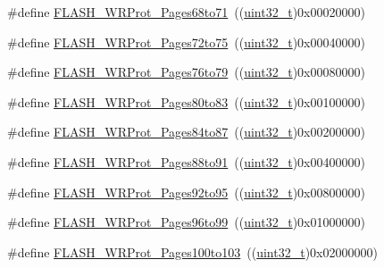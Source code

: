 \begin{DoxyCompactItemize}
\#define \hyperlink{group___option___bytes___write___protection_gafbb813885c6cd505c64083f2f88532fb}{F\+L\+A\+S\+H\+\_\+\+W\+R\+Prot\+\_\+\+Pages68to71}~((\hyperlink{_p_e___types_8h_a33594304e786b158f3fb30289278f5af}{uint32\+\_\+t})0x00020000)
\item 
\#define \hyperlink{group___option___bytes___write___protection_ga1a19c52012bbb30f3ae1599fa5a200cc}{F\+L\+A\+S\+H\+\_\+\+W\+R\+Prot\+\_\+\+Pages72to75}~((\hyperlink{_p_e___types_8h_a33594304e786b158f3fb30289278f5af}{uint32\+\_\+t})0x00040000)
\item 
\#define \hyperlink{group___option___bytes___write___protection_ga9e1f9abfa57766312c6cbae9b42f3ab6}{F\+L\+A\+S\+H\+\_\+\+W\+R\+Prot\+\_\+\+Pages76to79}~((\hyperlink{_p_e___types_8h_a33594304e786b158f3fb30289278f5af}{uint32\+\_\+t})0x00080000)
\item 
\#define \hyperlink{group___option___bytes___write___protection_ga5749428874f99f77a5c5fc48a88816d9}{F\+L\+A\+S\+H\+\_\+\+W\+R\+Prot\+\_\+\+Pages80to83}~((\hyperlink{_p_e___types_8h_a33594304e786b158f3fb30289278f5af}{uint32\+\_\+t})0x00100000)
\item 
\#define \hyperlink{group___option___bytes___write___protection_ga9dbf7aeb5b54b42f9b345c95d00eaf32}{F\+L\+A\+S\+H\+\_\+\+W\+R\+Prot\+\_\+\+Pages84to87}~((\hyperlink{_p_e___types_8h_a33594304e786b158f3fb30289278f5af}{uint32\+\_\+t})0x00200000)
\item 
\#define \hyperlink{group___option___bytes___write___protection_gaeece6aa5e198239067c47f678b9d015e}{F\+L\+A\+S\+H\+\_\+\+W\+R\+Prot\+\_\+\+Pages88to91}~((\hyperlink{_p_e___types_8h_a33594304e786b158f3fb30289278f5af}{uint32\+\_\+t})0x00400000)
\item 
\#define \hyperlink{group___option___bytes___write___protection_gab7d95c1f574523ef827bafd01a64b0bb}{F\+L\+A\+S\+H\+\_\+\+W\+R\+Prot\+\_\+\+Pages92to95}~((\hyperlink{_p_e___types_8h_a33594304e786b158f3fb30289278f5af}{uint32\+\_\+t})0x00800000)
\item 
\#define \hyperlink{group___option___bytes___write___protection_ga8f3ea488c33b3e209cab996545f55c49}{F\+L\+A\+S\+H\+\_\+\+W\+R\+Prot\+\_\+\+Pages96to99}~((\hyperlink{_p_e___types_8h_a33594304e786b158f3fb30289278f5af}{uint32\+\_\+t})0x01000000)
\item 
\#define \hyperlink{group___option___bytes___write___protection_ga0c03cee6931c623ccdaae19233c81f4e}{F\+L\+A\+S\+H\+\_\+\+W\+R\+Prot\+\_\+\+Pages100to103}~((\hyperlink{_p_e___types_8h_a33594304e786b158f3fb30289278f5af}{uint32\+\_\+t})0x02000000)
\item 

\end{DoxyCompactItemize}
